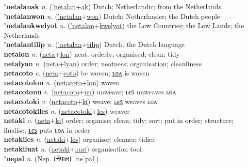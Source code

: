 \textbf{'netalanak} \textit{n.} (\hyperref['netalan]{'netalan}+\hyperref[ak]{ak})
Dutch; Netherlandic; from the Netherlands \label{'netalanak} \\
\textbf{'netalanwon} \textit{n.} (\hyperref['netalan]{'netalan}+\hyperref[won]{won})
Dutch; Netherlander; the Dutch people \label{'netalanwon} \\
\textbf{'netalankwelyot} \textit{n.} (\hyperref['netalan]{'netalan}+\hyperref[kwelyot]{kwelyot})
the Low Countries; the Low Lands; the Netherlands \label{'netalankwelyot} \\
\textbf{'netalantilip} \textit{n.} (\hyperref['netalan]{'netalan}+\hyperref[tilip]{tilip})
Dutch; the Dutch language \label{'netalantilip} \\
\textbf{netalon} \textit{n.} (\hyperref[neta]{neta}+\hyperref[lon]{lon})
neat; orderly; organised; clean; tidy \label{netalon} \\
\textbf{netalyan} \textit{n.} (\hyperref[neta]{neta}+\hyperref[lyan]{lyan})
order; neatness; organisation; cleanliness \label{netalyan} \\
\textbf{netacoto} \textit{v.} (\hyperref[neta]{neta}+\hyperref[coto]{coto})
be woven; \hyperref[netacotolon]{ʟᴏᴧ} is woven \label{netacoto} \\
\textbf{netacotolon} \textit{n.} (\hyperref[netacoto]{netacoto}+\hyperref[lon]{lon})
woven \label{netacotolon} \\
\textbf{netacotonu} \textit{v.} (\hyperref[netacoto]{netacoto}+\hyperref[nu]{nu})
unweave; ʟєꜱ unweaves ʟᴏᴧ \label{netacotonu} \\
\textbf{netacotoki} \textit{v.} (\hyperref[netacoto]{netacoto}+\hyperref[ki]{ki})
weave; \hyperref[netacotokiles]{ʟєꜱ} weaves ʟᴏᴧ \label{netacotoki} \\
\textbf{netacotokiles} \textit{n.} (\hyperref[netacotoki]{netacotoki}+\hyperref[les]{les})
weaver \label{netacotokiles} \\
\textbf{netaki} \textit{v.} (\hyperref[neta]{neta}+\hyperref[ki]{ki})
order; organise; clean; tidy; sort; put in order; structure; finalise; \hyperref[netakiles]{ʟєꜱ} puts ʟᴏᴧ in order \label{netaki} \\
\textbf{netakiles} \textit{n.} (\hyperref[netaki]{netaki}+\hyperref[les]{les})
organiser; cleaner; tidier \label{netakiles} \\
\textbf{netakiluat} \textit{n.} (\hyperref[netaki]{netaki}+\hyperref[luat]{luat})
organisation tool \label{netakiluat} \\
\textbf{'nepal} \textit{n.} (Nep. ⟨नेपाल⟩ [neˈpal])
